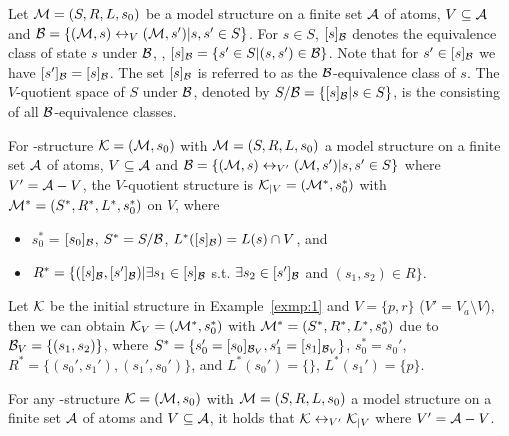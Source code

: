 \documentclass{article}
\begin{document}
Let ${\cal M}=(S, R, L,s_0)$ be a model structure on a finite set ${\cal A}$ of atoms, $V\subseteq {\cal A}$ and ${\cal B} = \{({\cal M}, s) \leftrightarrow_V ({\cal M}, s') | s, s' \in S\}$.
For $s\in S$, $[s]_{{\cal B}}$ denotes the equivalence class of state $s$ under ${\cal B}$, \ie, $[s]_{{\cal B}}=\{s' \in S| (s, s') \in {\cal B}\}$.
Note that for $s'\in [s]_{{\cal B}}$ we have $[s']_{{\cal B}} = [s]_{{\cal B}}$.
The set $[s]_{{\cal B}}$ is referred to as the ${\cal B}$-equivalence class of $s$.
The $V$-quotient space of $S$ under ${\cal B}$, denoted by $S/{\cal B}=\{[s]_{{\cal B}}| s\in S\}$, is the consisting of all ${\cal B}$-equivalence classes.
\begin{definition}
\label{def:V-quotient}
For \MPK-structure ${\cal K} = ({\cal M}, s_0)$ with ${\cal M} = (S, R, L,s_0)$ a model structure on a finite set ${\cal A}$ of atoms, $V \subseteq {\cal A}$ and ${\cal B} = \{({\cal M}, s) \leftrightarrow_{V'} ({\cal M}, s') | s, s' \in S\}$ where $V' ={\cal A}-V$, the $V$-quotient structure is ${\cal K}_{|V}=({\cal M}^*, s_0^*)$ with ${\cal M}^*=(S^*, R^*, L^*,s_0^*)$ on $V$, where
\begin{itemize}
  \item $s_0^*$ = $[s_0]_{{\cal B}}$, $S^* = S/{\cal B}$,  $L^*([s]_{{\cal B}}) = L(s) \cap V$, and
  \item $R^* = \{([s]_{{\cal B}},[s']_{{\cal B}})| \exists s_1\in [s]_{{\cal B}}$ s.t. $\exists s_2\in [s']_{{\cal B}}$ and $(s_1, s_2) \in R\}$.
\end{itemize}
\end{definition}

\begin{example}\label{exmp:VB}
Let $\cal K$ be the initial structure in Example~\ref{exmp:1} and $V=\{p,r\}$ ($V'= V_a\setminus V$), then we can obtain ${\cal K}_V=({\cal M}^*, s_0^*)$ with ${\cal M}^* =(S^*, R^*, L^*, s_0^*)$ due to ${\cal B}_V=\{(s_1,s_2)\}$, where $S^*=\{s_0'=[s_0]_{{\cal B}_V}, s_1'=[s_1]_{{\cal B}_V}\}$, $s_0^* = s_0'$, $R^*=\{(s_0',s_1'), (s_1', s_0')\}$, and $L^*(s_0') =\{\}$, $L^*(s_1') = \{p\}$.
\end{example}

\begin{proposition}
\label{pro:VQ}
For any \MPK-structure ${\cal K} = ({\cal M}, s_0)$ with ${\cal M} = (S, R, L,s_0)$ a model structure on a finite set ${\cal A}$ of atoms and $V \subseteq {\cal A}$, it holds that ${\cal K}\leftrightarrow_{V'} {\cal K}_{|V}$ where $V'={\cal A}-V$.
\end{proposition}
\end{document}
